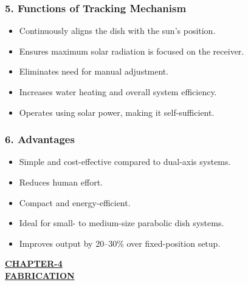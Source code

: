 \documentclass[12pt,a4paper]{article}
\begin{document}
\vspace{4mm}
\subsubsection*{5. Functions of Tracking Mechanism}
\begin{itemize}[leftmargin=8mm, itemsep=2mm, label=\textbullet]
  \item Continuously aligns the dish with the sun's position.
  \item Ensures maximum solar radiation is focused on the receiver.
  \item Eliminates need for manual adjustment.
  \item Increases water heating and overall system efficiency.
  \item Operates using solar power, making it self-sufficient.
\end{itemize}

\vspace{4mm}
\subsubsection*{6. Advantages}
\begin{itemize}[leftmargin=8mm, itemsep=2mm, label=\textbullet]
  \item Simple and cost-effective compared to dual-axis systems.
  \item Reduces human effort.
  \item Compact and energy-efficient.
  \item Ideal for small- to medium-size parabolic dish systems.
  \item Improves output by 20--30\% over fixed-position setup.
\end{itemize}
\clearpage




\begin{center}
  {\fontsize{15}{18}\selectfont \bfseries \textcolor{red!80!black}{\underline{CHAPTER-4}}}\\[2mm]
  {\fontsize{16}{20}\selectfont \bfseries \textcolor{red!80!black}{\underline{FABRICATION}}}\\[5mm]
\end{center}
\end{document}
